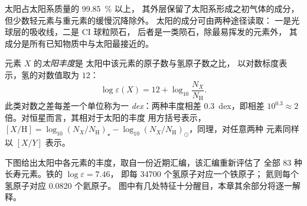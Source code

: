 太阳占太阳系质量的 \qty{99.85}{\percent} 以上，
其外层保留了太阳系形成之初气体的成分，
但少数轻元素与重元素的缓慢沉降除外。
太阳的成分可由两种途径读取：
一是光球层的吸收线，二是 CI 球粒陨石，
后者是一类陨石，除最易挥发的元素外，
其成分是所有已知物质中与太阳最接近的。

\begin{definition}\label{def:b3:origin-of-elements:abundance}
元素 $X$ 的\emph{太阳丰度}是
太阳中该元素的原子数与氢原子数之比，
以对数标度表示，氢的对数值取为 $12$：
\[
\log\varepsilon(X) = 12 + \log_{10}\frac{N_X}{N_\mathrm{H}} .
\]
此类对数之差每差一个单位称为一
\emph{dex}：两种丰度相差 $0.3$~dex，即相差
$10^{0.3} \approx 2$ 倍。对恒星而言，其相对于太阳的丰度
用方括号表示，
$[X/\mathrm{H}] = \log_{10}(N_X/N_\mathrm{H})_\star -
\log_{10}(N_X/N_\mathrm{H})_\odot$，同理，对任意两种
元素同样以 $[X/Y]$ 表示。
\end{definition}

下图给出太阳中各元素的丰度，取自一份近期汇编，该汇编重新评估了
全部 83 种长寿元素。铁的 $\log\varepsilon = 7.46$，
即每 \num{34700} 个氢原子对应一个铁原子；
氦则每个氢原子对应 \num{0.0820} 个氦原子。
图中有几处特征十分醒目，本章其余部分将逐一解释。

